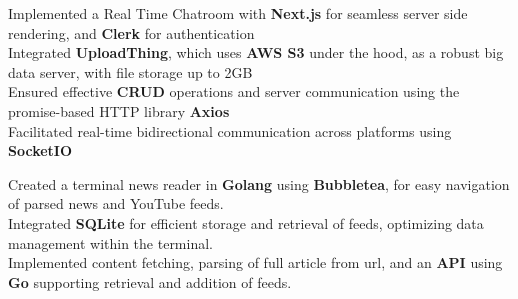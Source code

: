 \documentclass[]{Nikhil_Kadiyan_Resume}
\begin{document}

\pt Implemented a Real Time Chatroom  with \textbf{Next.js} for seamless server side rendering, and \textbf{Clerk} for authentication\\
\pt Integrated \textbf{UploadThing}, which uses \textbf{AWS S3} under the hood, as a robust big data server, with file storage up to 2GB\\
\pt Ensured effective \textbf{CRUD} operations and server communication using the promise-based HTTP library \textbf{Axios}\\
\pt Facilitated real-time bidirectional communication across platforms using \textbf{SocketIO}\\
\sectionsep

\pt Created a terminal news reader in \textbf{Golang} using \textbf{Bubbletea}, for easy navigation of parsed news and YouTube feeds.\\
\pt Integrated \textbf{SQLite} for efficient storage and retrieval of feeds, optimizing data management within the terminal. \\
\pt Implemented content fetching, parsing of full article from url, and an \textbf{API} using \textbf{Go} supporting retrieval and addition of feeds.\\
\sectionsep
\end{document}
